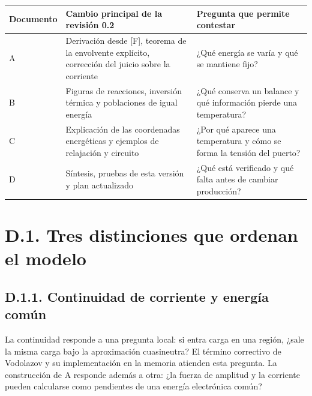 \documentclass[
  spanish,
  10pt,
  a4paper,
]{article}
\newcounter{none} %
\begin{document}
{\def\LTcaptype{none} %
\begin{longtable}[]{@{}
  >{\raggedright\arraybackslash}p{}
  >{\raggedright\arraybackslash}p{}
  >{\raggedright\arraybackslash}p{}@{}}
\toprule\noalign{}
\begin{minipage}[b]{\linewidth}\raggedright
Documento
\end{minipage} & \begin{minipage}[b]{\linewidth}\raggedright
Cambio principal de la revisión 0.2
\end{minipage} & \begin{minipage}[b]{\linewidth}\raggedright
Pregunta que permite contestar
\end{minipage} \\
\midrule\noalign{}
\endhead
\bottomrule\noalign{}
\endlastfoot
A & Derivación desde {[}F{]}, teorema de la envolvente explícito,
corrección del juicio sobre la corriente & ¿Qué energía se varía y qué
se mantiene fijo? \\
B & Figuras de reacciones, inversión térmica y poblaciones de igual
energía & ¿Qué conserva un balance y qué información pierde una
temperatura? \\
C & Explicación de las coordenadas energéticas y ejemplos de relajación
y circuito & ¿Por qué aparece una temperatura y cómo se forma la tensión
del puerto? \\
D & Síntesis, pruebas de esta versión y plan actualizado & ¿Qué está
verificado y qué falta antes de cambiar producción? \\
\end{longtable}
}

\section{D.1. Tres distinciones que ordenan el
modelo}\label{d.1.-tres-distinciones-que-ordenan-el-modelo}

\subsection{D.1.1. Continuidad de corriente y energía
común}\label{d.1.1.-continuidad-de-corriente-y-energuxeda-comuxfan}

La continuidad responde a una pregunta local: si entra carga en una
región, ¿sale la misma carga bajo la aproximación cuasineutra? El
término correctivo de Vodolazov y su implementación en la memoria
atienden esta pregunta. La construcción de A responde además a otra: ¿la
fuerza de amplitud y la corriente pueden calcularse como pendientes de
una energía electrónica común?
\end{document}
